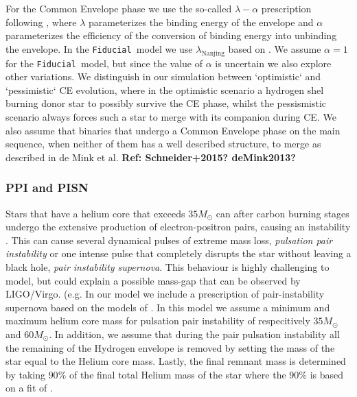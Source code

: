 \documentclass[a4paper,fleqn,usenatbib]{mnras}
\newcommand{\floor}[1]{\textbf{\textcolor{ochre}{#1}}}
\newcommand\Fiducial{\texttt{Fiducial }}
\begin{document}
For the Common Envelope phase we use the so-called $\lambda-\alpha$ prescription following \citet{webbink1984double,de1990common}, where $\lambda$ parameterizes the binding energy of the envelope and $\alpha$ parameterizes the efficiency of the conversion of binding energy into unbinding the envelope. In the \Fiducial model we use $\lambda_{\text{Nanjing}}$  based on \citet{xu2010binding}. We assume $\alpha = 1$ for the \Fiducial model, but since the value of $\alpha$ is uncertain we also explore other variations.  We distinguish in our simulation between `optimistic` and `pessimistic` CE evolution, where in the optimistic scenario a hydrogen shel burning donor star to possibly survive the CE phase, whilst the pessismistic scenario always forces such a star to merge with its companion during CE.   We also assume that binaries that undergo a Common Envelope phase on the main sequence, when neither of them has a well described structure, to merge as described in de Mink et al. \floor{Ref: Schneider+2015? deMink2013?}


\subsubsection{PPI and PISN}
\label{subsec:PISN}
Stars that have a helium core that exceeds $35 M_{\odot}$ can after carbon burning stages undergo  the extensive production of electron-positron pairs, causing an instability \citet{fowler1964neutrino,rakavy1967carbon,barkat1967dynamics}. This can cause several dynamical pulses of extreme mass loss, \emph{pulsation pair instability} or one intense pulse that completely disrupts the star without leaving a black hole, \emph{pair instability supernova}. This behaviour is highly challenging to model, but could explain a possible mass-gap that can be observed by LIGO/Virgo. (e.g. \citealt{belczynski2016effect, kovetz2017black,vitale2017use, talbot2018measuring}    
In our model we include a prescription of pair-instability supernova based on the models of \citet{woosley2017pulsational}. In this model we assume a minimum and maximum helium core mass for pulsation pair instability of respecitively $35 M_{\odot}$ and  $60 M_{\odot}$. In addition, we assume that during the pair pulsation instability all the remaining of the Hydrogen envelope is removed by setting the mass of the star equal to the Helium core mass. Lastly, the final remnant mass is determined by taking $90 \%$ of the final total Helium mass of the star where the $90\%$ is based on a fit of \citet{woosley2017pulsational}. 
\end{document}
